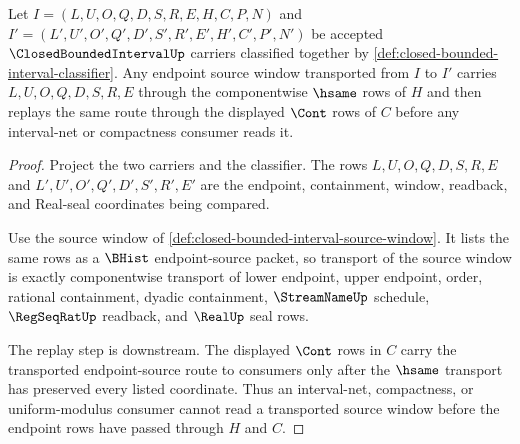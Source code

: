\begin{theorem}
\label{thm:closed-bounded-interval-source-transport}
Let $I=(L,U,O,Q,D,S,R,E,H,C,P,N)$ and $I'=(L',U',O',Q',D',S',R',E',H',C',P',N')$ be accepted $\ClosedBoundedIntervalUp$ carriers classified together by \autoref{def:closed-bounded-interval-classifier}. Any endpoint source window transported from $I$ to $I'$ carries $L,U,O,Q,D,S,R,E$ through the componentwise $\hsame$ rows of $H$ and then replays the same route through the displayed $\Cont$ rows of $C$ before any interval-net or compactness consumer reads it.
\end{theorem}
\begin{proof}
Project the two carriers and the classifier. The rows $L,U,O,Q,D,S,R,E$ and $L',U',O',Q',D',S',R',E'$ are the endpoint, containment, window, readback, and Real-seal coordinates being compared.

Use the source window of \autoref{def:closed-bounded-interval-source-window}. It lists the same rows as a $\BHist$ endpoint-source packet, so transport of the source window is exactly componentwise transport of lower endpoint, upper endpoint, order, rational containment, dyadic containment, $\StreamNameUp$ schedule, $\RegSeqRatUp$ readback, and $\RealUp$ seal rows.

The replay step is downstream. The displayed $\Cont$ rows in $C$ carry the transported endpoint-source route to consumers only after the $\hsame$ transport has preserved every listed coordinate. Thus an interval-net, compactness, or uniform-modulus consumer cannot read a transported source window before the endpoint rows have passed through $H$ and $C$.
\end{proof}

